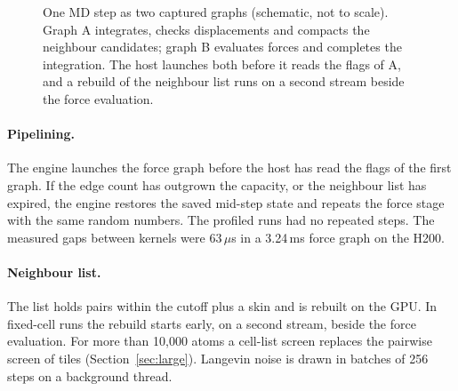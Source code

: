 \documentclass[11pt]{article}
\newcommand{\us}{\,\ensuremath{\mu}s}
\newcommand{\ms}{\,ms}
\begin{document}
\begin{figure}[t]
\centering
{}
\caption{One MD step as two captured graphs (schematic, not to scale). Graph A integrates, checks displacements
and compacts the neighbour candidates; graph B evaluates forces and completes the integration. The host launches
both before it reads the flags of A, and a rebuild of the neighbour list runs on a second stream beside the
force evaluation.}
\label{fig:timeline}
\end{figure}

\paragraph{Pipelining.}
The engine launches the force graph before the host has read the flags of the first graph. If the edge count has
outgrown the capacity, or the neighbour list has expired, the engine restores the saved mid-step state and
repeats the force stage with the same random numbers. The profiled runs had no repeated steps. The measured gaps
between kernels were 63\us{} in a 3.24\ms{} force graph on the H200.

\paragraph{Neighbour list.}
The list holds pairs within the cutoff plus a skin \cite{verlet1967} and is rebuilt on the GPU. In fixed-cell
runs the rebuild starts early, on a second stream, beside the force evaluation. For more than 10{,}000 atoms a
cell-list screen replaces the pairwise screen of tiles (Section~\ref{sec:large}). Langevin noise is drawn in
batches of 256 steps on a background thread.
\end{document}
